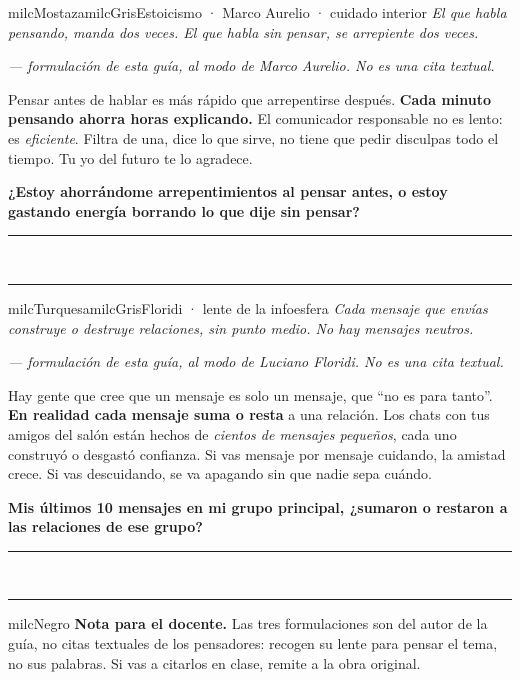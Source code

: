 \documentclass[11pt,letterpaper]{article}
\newcommand{\linead}[1]{\noindent\color{milcLinea}\rule{#1}{0.5pt}\color{milcNegro}}
\begin{document}
\begin{softbox}{milcMostaza}{milcGris}{Estoicismo · Marco Aurelio · cuidado interior}
\textit{El que habla pensando, manda dos veces. El que habla sin pensar, se arrepiente dos veces.}

{\footnotesize\itshape\color{milcNegro!70}--- formulación de esta guía, al modo de Marco Aurelio. No es una cita textual.}

Pensar antes de hablar es más rápido que arrepentirse después. \textbf{Cada minuto pensando ahorra horas explicando.} El comunicador responsable no es lento: es \emph{eficiente}. Filtra de una, dice lo que sirve, no tiene que pedir disculpas todo el tiempo. Tu yo del futuro te lo agradece.

\textbf{¿Estoy ahorrándome arrepentimientos al pensar antes, o estoy gastando energía borrando lo que dije sin pensar?}
\end{softbox}
\linead{\linewidth}\\[1mm]
\linead{\linewidth}

\begin{softbox}{milcTurquesa}{milcGris}{Floridi · lente de la infoesfera}
\textit{Cada mensaje que envías construye o destruye relaciones, sin punto medio. No hay mensajes neutros.}

{\footnotesize\itshape\color{milcNegro!70}--- formulación de esta guía, al modo de Luciano Floridi. No es una cita textual.}

Hay gente que cree que un mensaje es solo un mensaje, que ``no es para tanto''. \textbf{En realidad cada mensaje suma o resta} a una relación. Los chats con tus amigos del salón están hechos de \emph{cientos de mensajes pequeños}, cada uno construyó o desgastó confianza. Si vas mensaje por mensaje cuidando, la amistad crece. Si vas descuidando, se va apagando sin que nadie sepa cuándo.

\textbf{Mis últimos 10 mensajes en mi grupo principal, ¿\textbf{sumaron o restaron} a las relaciones de ese grupo?}
\end{softbox}
\linead{\linewidth}\\[1mm]
\linead{\linewidth}

\begin{infoband}{milcNegro}
\textbf{Nota para el docente.} Las tres formulaciones son del autor de la guía, no citas textuales de los pensadores: recogen su lente para pensar el tema, no sus palabras. Si vas a citarlos en clase, remite a la obra original.
\end{infoband}
\end{document}
